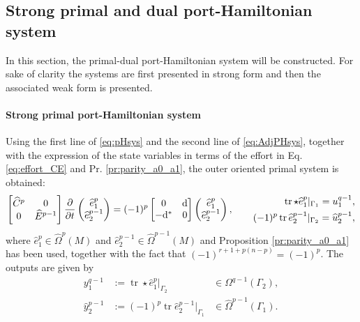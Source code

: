 \documentclass{elsarticle}
\newcommand{\revTwo}[1]{{\color{black}#1}}
\renewcommand\d{\ensuremath{\mathrm{d}}}
\DeclareMathOperator{\tr}{tr}
\newcommand*{\dual}[1]{\ensuremath{\widehat{#1}}}
\begin{document}
\revTwo{
\subsection{Strong primal and dual port-Hamiltonian system} 
In this section, the primal-dual port-Hamiltonian system will be constructed. For sake of clarity the systems are first presented in strong form and then the associated weak form is presented.

\paragraph{Strong primal port-Hamiltonian system}
Using the first line of \eqref{eq:pHsys} and the second line of \eqref{eq:AdjPHsys}, together with the expression of the state variables in terms of the effort in Eq. \eqref{eq:effort_CE} and Pr. \ref{pr:parity_a0_a1}, the outer oriented primal system is obtained: 
 \begin{equation}\label{eq:strong_primalPH}
    \begin{bmatrix}
        \dual{C}^p & 0 \\
        0 & \dual{E}^{p-1}
    \end{bmatrix}
    \diffp{}{t}\begin{pmatrix}
        \dual{e}^p_1 \\
        \dual{e}^{p-1}_2 
    \end{pmatrix} = (-1)^{p}
    \begin{bmatrix}
        0 & \d \\
        -\d^* & 0\\
    \end{bmatrix}
    \begin{pmatrix}
        \dual{e}^p_1 \\
        \dual{e}^{p-1}_2 
    \end{pmatrix}, \qquad
    \begin{aligned}
        \tr {\star \dual{e}_1^p}|_{\Gamma_1} = u_1^{q-1}, \\
        (-1)^p\tr \dual{e}_2^{p-1}|_{\Gamma_2} = \dual{u}_2^{p-1}, \\
    \end{aligned}
 \end{equation}
 where $\dual{e}_1^p \in \dual{\Omega}^p(M)$ and $\dual{e}_2^{p-1} \in \dual{\Omega}^{p-1}(M)$ and Proposition \ref{pr:parity_a0_a1} has been used, together with the fact that $(-1)^{r+1+p(n-p)}= (-1)^p$. The outputs are given by
 \begin{equation}\label{eq:y_primal}
 \begin{aligned}
      y^{q-1}_1 &:= \tr \star \dual{e}^{p}_1 \vert_{\Gamma_2} &\in \Omega^{q-1}(\Gamma_2), \\
    \dual{y}^{p-1}_2 &:= (-1)^p \tr \dual{e}^{p-1}_2 \vert_{\Gamma_1} &\in \dual{\Omega}^{p-1}(\Gamma_1). 
 \end{aligned}
 \end{equation}

}
\end{document}
